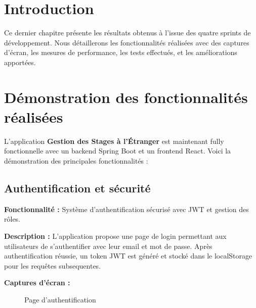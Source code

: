 \documentclass[12pt,a4paper]{report}
\begin{document}
\section*{Introduction}

Ce dernier chapitre présente les résultats obtenus à l'issue des quatre sprints de développement. Nous détaillerons les fonctionnalités réalisées avec des captures d'écran, les mesures de performance, les tests effectués, et les améliorations apportées.

\section{Démonstration des fonctionnalités réalisées}

L'application \textbf{Gestion des Stages à l'Étranger} est maintenant fully fonctionnelle avec un backend Spring Boot et un frontend React. Voici la démonstration des principales fonctionnalités :

\subsection{Authentification et sécurité}

\textbf{Fonctionnalité :} Système d'authentification sécurisé avec JWT et gestion des rôles.

\textbf{Description :} L'application propose une page de login permettant aux utilisateurs de s'authentifier avec leur email et mot de passe. Après authentification réussie, un token JWT est généré et stocké dans le localStorage pour les requêtes subsequentes.

\textbf{Captures d'écran :}

\begin{figure}[H]
\centering
{}
\caption{Page d'authentification}
\end{figure}
\end{document}
